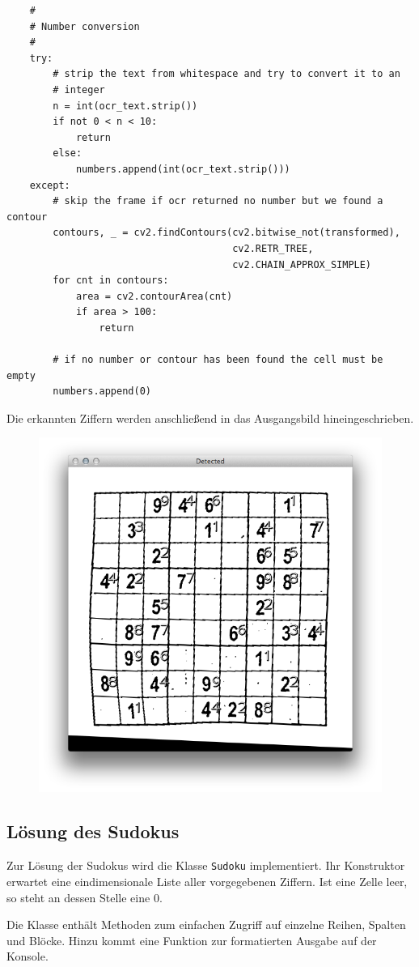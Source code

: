 \begin{lstlisting}
    #
    # Number conversion
    #
    try:
        # strip the text from whitespace and try to convert it to an
        # integer
        n = int(ocr_text.strip())
        if not 0 < n < 10:
            return
        else:
            numbers.append(int(ocr_text.strip()))
    except:
        # skip the frame if ocr returned no number but we found a contour
        contours, _ = cv2.findContours(cv2.bitwise_not(transformed),
                                       cv2.RETR_TREE,
                                       cv2.CHAIN_APPROX_SIMPLE)
        for cnt in contours:
            area = cv2.contourArea(cnt)
            if area > 100:
                return

        # if no number or contour has been found the cell must be empty
        numbers.append(0)
\end{lstlisting}

Die erkannten Ziffern werden anschließend in das Ausgangsbild hineingeschrieben.

\begin{figure}[H]
    \begin{center}
        \includegraphics[width=.5\textwidth]{Abbildungen/detected}
    \end{center}
\end{figure}


\subsection{Lösung des Sudokus}
Zur Lösung der Sudokus wird die Klasse \lstinline{Sudoku} implementiert.
Ihr Konstruktor erwartet eine eindimensionale Liste aller vorgegebenen Ziffern.
Ist eine Zelle leer, so steht an dessen Stelle eine $0$.

Die Klasse enthält Methoden zum einfachen Zugriff auf einzelne Reihen, Spalten und Blöcke. Hinzu kommt eine Funktion zur formatierten Ausgabe auf der Konsole.

